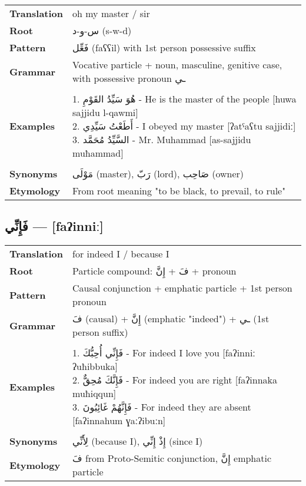 \documentclass[letterpaper,12pt]{article}
\begin{document}
\begin{tabular}{p{3cm}p{10cm}}
\toprule
\textbf{Translation} & oh my master / sir \\
\textbf{Root} & \textarabic{س-و-د} (s-w-d) \\
\textbf{Pattern} & \textarabic{فَعِّل} (faʕʕil) with 1st person possessive suffix \\
\textbf{Grammar} & Vocative particle + noun, masculine, genitive case, with possessive pronoun \textarabic{ـي} \\
\midrule \\
\textbf{Examples} & \makecell[l]{\parbox{9.5cm}{
1. \textarabic{هُوَ سَيِّدُ القَوْمِ} - He is the master of the people [huwa sajjidu l-qawmi]\\
2. \textarabic{أَطَعْتُ سَيِّدِي} - I obeyed my master [ʔatˤaʕtu sajjidiː]\\
3. \textarabic{السَّيِّدُ مُحَمَّد} - Mr. Muhammad [as-sajjidu muħammad]
}} \\
\midrule \\
\textbf{Synonyms} & \textarabic{مَوْلَى} (master), \textarabic{رَبّ} (lord), \textarabic{صَاحِب} (owner) \\
\textbf{Etymology} & From root meaning "to be black, to prevail, to rule" \\
\bottomrule
\end{tabular}

\subsection{\textarabic{فَإِنِّي} — [faʔinniː]}

\begin{tabular}{p{3cm}p{10cm}}
\toprule
\textbf{Translation} & for indeed I / because I \\
\textbf{Root} & Particle compound: \textarabic{فَ} + \textarabic{إِنَّ} + pronoun \\
\textbf{Pattern} & Causal conjunction + emphatic particle + 1st person pronoun \\
\textbf{Grammar} & \textarabic{فَ} (causal) + \textarabic{إِنَّ} (emphatic "indeed") + \textarabic{ـي} (1st person suffix) \\
\midrule \\
\textbf{Examples} & \makecell[l]{\parbox{9.5cm}{
1. \textarabic{فَإِنِّي أُحِبُّكَ} - For indeed I love you [faʔinniː ʔuħibbuka]\\
2. \textarabic{فَإِنَّكَ مُحِقٌّ} - For indeed you are right [faʔinnaka muħiqqun]\\
3. \textarabic{فَإِنَّهُمْ غَائِبُونَ} - For indeed they are absent [faʔinnahum ɣaːʔibuːn]
}} \\
\midrule \\
\textbf{Synonyms} & \textarabic{لِأَنِّي} (because I), \textarabic{إِذْ إِنِّي} (since I) \\
\textbf{Etymology} & \textarabic{فَ} from Proto-Semitic conjunction, \textarabic{إِنَّ} emphatic particle \\
\bottomrule
\end{tabular}
\end{document}
